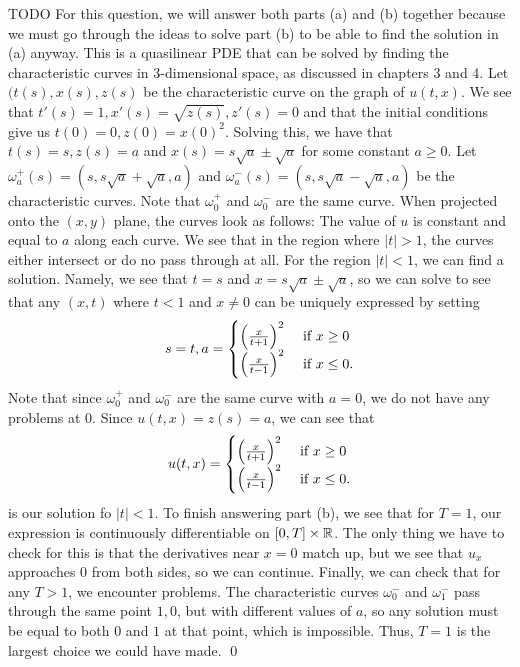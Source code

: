 \documentclass{article}
\begin{document}
\newpage
{}TODO \tri 
\hop 
For this question, we will answer both parts (a) and (b) together because we must go through the ideas to solve part (b) to be able to find the solution in (a) anyway. This is a quasilinear PDE that can be solved by finding the characteristic curves in 3-dimensional space, as discussed in chapters 3 and 4. 
\hop 
Let $(t(s), x(s), z(s)$ be the characteristic curve on the graph of $u(t,x)$. We see that $t'(s) = 1, x'(s)=\sqrt{z(s)}, z'(s) = 0$ and that the initial conditions give us $t(0)=0, z(0)= x(0)^2.$ Solving this, we have that $t(s)=s, z(s)=a$ and $x(s) = s\sqrt{a} \pm \sqrt{a}$ for some constant $a\ge0$. Let $\omega^+_a(s) = (s, s\sqrt{a} + \sqrt{a}, a)$ and $\omega^-_a(s) = (s, s\sqrt{a} - \sqrt{a}, a)$ be the characteristic curves. Note that $\omega^+_0$ and $\omega^-_0$ are the same curve. When projected onto the $(x,y)$ plane, the curves look as follows:
\hop %
The value of $u$ is constant and equal to $a$ along each curve. We see that in the region where $|t| > 1$, the curves either intersect or do no pass through at all. For the region $|t| < 1$, we can find a solution. Namely, we see that $t= s$ and $x = s\sqrt{a} \pm \sqrt{a}$, so we can solve to see that any $(x,t)$ where $t < 1$ and $x \ne 0$ can be uniquely expressed by setting 
\[s= t, a = \begin{cases}
    \del{\frac{x}{t+1}}^2 &\text{ if } x\ge  0 \\
    \del{\frac{x}{t-1}}^2 &\text{ if } x\le 0.
\end{cases}\]
Note that since $\omega^+_0$ and $\omega^-_0$ are the same curve with $a=0$, we do not have any problems at 0. Since $u(t,x) = z(s) = a$, we can see that  
\[u(t,x) = \begin{cases}
    \del{\frac{x}{t+1}}^2 &\text{ if } x\ge  0 \\
    \del{\frac{x}{t-1}}^2 &\text{ if } x\le 0.
\end{cases}\]
is our solution fo $|t|<1$. To finish answering part (b), we see that for $T=1$, our expression is continuously differentiable on $[0,T] \times \mathbb{R}$. The only thing we have to check for this is that the derivatives near $x = 0$ match up, but we see that $u_x$ approaches $0$ from both sides, so we can continue.
\hop 
Finally, we can check that for any $T>1$, we encounter problems. The characteristic curves $\omega_0^-$ and $\omega_1^-$ pass through the same point $1, 0$, but with different values of $a$, so any solution must be equal to both $0$ and $1$ at that point, which is impossible. Thus, $T=1$ is the largest choice we could have made. \qed
\hop
\end{document}
